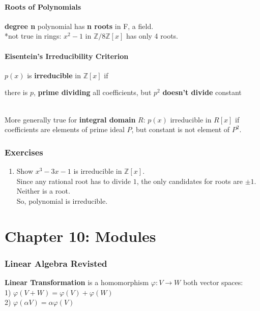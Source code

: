 \documentclass[12pt]{article}
\def\Z{\ensuremath{\mathbb{Z}}}
\newcommand{\bt}[1]{\textbf{#1}} %
\newcommand{\gray}[1]{\textcolor[gray]{0.5}{#1}} %
\begin{document}
\subsection*{Roots of Polynomials}

\bt{degree n} polynomial has \bt{n roots} in F, a field. \\
*not true in rings: $x^2 -1$ in $\Z / 8 \Z[x]$ has only 4 roots.

\subsection*{Eisentein's Irreducibility Criterion}
$p(x)$ is \bt{irreducible} in $\Z[x]$ if \\
\centerline{there is $p$, \bt{prime dividing} all coefficients, but $p^2$ \bt{doesn't divide} constant}\\

More generally true for \bt{integral domain} $R$: $p(x)$ irreducible in $R[x]$ if\\ coefficients are elements of prime ideal $P$, but constant is not element of $P^2$.


\section*{Exercises}
\begin{enumerate}
    \item Show $x^3 - 3x -1$ is irreducible in $\Z[x]$. \\
    \gray{Since any rational root has to divide $1$, the only candidates for roots are $\pm 1$.\\
    Neither is a root. \\
    So, polynomial is irreducible.}


\end{enumerate}

\part*{Chapter 10: Modules}

\section*{Linear Algebra Revisted}

 \bt{Linear Transformation} is a homomorphism $\varphi: V \rightarrow W$ both vector spaces:\\
 1) $\varphi(V + W) = \varphi(V) + \varphi(W)$\\
 2) $\varphi(\alpha V) = \alpha \varphi(V)$\\
\end{document}
